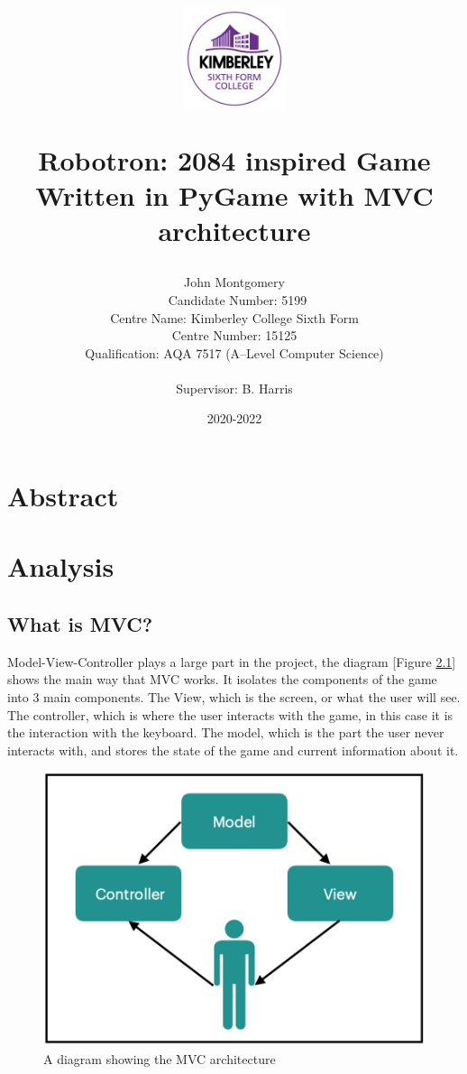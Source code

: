 \documentclass[a4paper, 11pt]{report}
\title{%
    
    \begin{center}
        \includegraphics[width=3cm]{kimberley.png}
        \centering
    \end{center}
  Robotron: 2084 inspired Game \\
  \large Written in PyGame with MVC architecture}
\author{{\Large John Montgomery}\\ \ 
Candidate Number: 5199\\
Centre Name: Kimberley College Sixth Form\\
Centre Number: 15125\\
Qualification: AQA 7517 (A--Level Computer Science)\\ \\
{\small Supervisor: B. Harris}}
\date{2020-2022}
\begin{document}
\maketitle

\newpage
\tableofcontents\thispagestyle{empty}
\newpage
\listoffigures\thispagestyle{empty}
\newpage
\chapter{Abstract}
    

\chapter{Analysis}
\section{What is MVC?}
Model-View-Controller plays a large part in the project, the diagram [Figure \ref{fig:MVC_overview}] shows the main way that MVC works. It isolates the components of the game into 3 main components. The View, which is the screen, or what the user will see. The controller, which is where the user interacts with the game, in this case it is the interaction with the keyboard. The model, which is the part the user never interacts with, and stores the state of the game and current information about it.

\begin{figure}[h]
  \includegraphics[width=\linewidth]{MVC overview.png}
  \caption{A diagram showing the MVC architecture}
  \label{fig:MVC_overview}
\end{figure}
\end{document}
